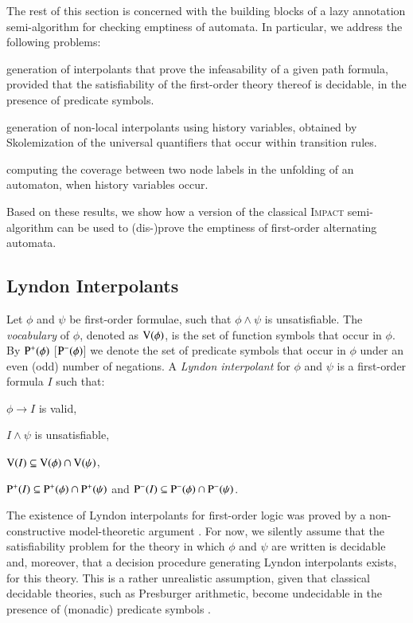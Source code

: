 \documentclass{llncs}
\begin{document}
The rest of this section is concerned with the building blocks of a
lazy annotation semi-algorithm for checking emptiness of automata. In
particular, we address the following problems: \begin{compactenum}
%
\item generation of interpolants that prove the infeasability of a
  given path formula, provided that the satisfiability of the
  first-order theory thereof is decidable, in the presence of
  predicate symbols.
%
\item generation of non-local interpolants using history variables,
  obtained by Skolemization of the universal quantifiers that occur
  within transition rules.
%
\item computing the coverage between two node labels in the unfolding
  of an automaton, when history variables occur. 
\end{compactenum} 
Based on these results, we show how a version of the classical
\textsc{Impact} \cite{McMillan06} semi-algorithm can be used to
(dis-)prove the emptiness of first-order alternating automata. 

\subsection{Lyndon Interpolants}

Let $\phi$ and $\psi$ be first-order formulae, such that $\phi \wedge
\psi$ is unsatisfiable. The \emph{vocabulary} of $\phi$, denoted as
$\mathrm{V}({\phi})$, is the set of function symbols that occur in $\phi$.  By
$\mathrm{P}^{+}(\phi)$ [$\mathrm{P}^{-}(\phi)$] we denote the set of predicate
symbols that occur in $\phi$ under an even (odd) number of
negations. A \emph{Lyndon interpolant} \cite{Lyndon59} for $\phi$ and
$\psi$ is a first-order formula $I$ such that: \begin{compactitem}
\item $\phi \rightarrow I$ is valid,  
\item $I \wedge \psi$ is unsatisfiable, 
\item $\mathrm{V}({I}) \subseteq \mathrm{V}({\phi}) \cap \mathrm{V}({\psi})$, 
\item $\mathrm{P}^{+}(I) \subseteq \mathrm{P}^{+}(\phi) \cap \mathrm{P}^{+}(\psi)$ and
  $\mathrm{P}^{-}(I) \subseteq \mathrm{P}^{-}(\phi) \cap \mathrm{P}^{-}(\psi)$.
\end{compactitem}
The existence of Lyndon interpolants for first-order logic was proved
by a non-constructive model-theoretic argument \cite{Lyndon59}. For
now, we silently assume that the satisfiability problem for the theory
in which $\phi$ and $\psi$ are written is decidable and, moreover,
that a decision procedure generating Lyndon interpolants exists, for
this theory. This is a rather unrealistic assumption, given that
classical decidable theories, such as Presburger arithmetic, become
undecidable in the presence of (monadic) predicate symbols
\cite{Halpern91}.
\end{document}
